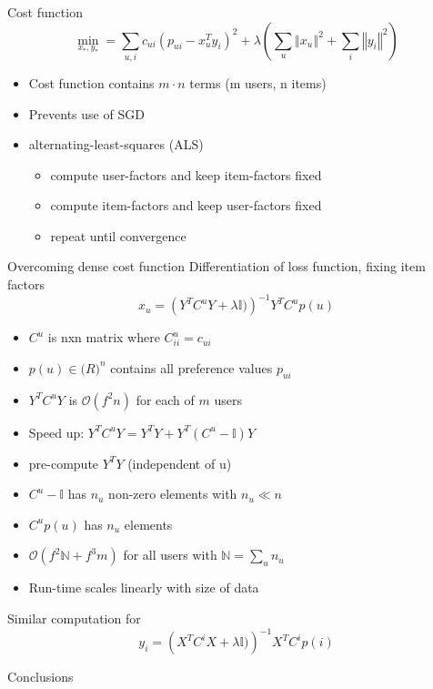\documentclass[aspectratio=1610]{beamer}
\begin{document}
\begin{frame}{Cost function}
    \begin{equation}
        \min_{x_{*}, y_{*}} = \sum_{u,i} c_{ui}\left( p_{ui} - x_{u}^{T} y_{i} \right)^2 + \lambda \left( \sum_{u} \left\Vert x_u \right\Vert^2 + \sum_{i} \left\Vert y_i \right\Vert^2 \right)
    \end{equation}
    \begin{itemize}
        \item Cost function contains $m \cdot n$ terms (m users, n items)
        \item Prevents use of SGD
        \item alternating-least-squares (ALS)
        \begin{itemize}
            \item compute user-factors and keep item-factors fixed
            \item compute item-factors and keep user-factors fixed
            \item repeat until convergence
        \end{itemize}
    \end{itemize}
\end{frame}

\begin{frame}{Overcoming dense cost function}
Differentiation of loss function, fixing item factors
\begin{equation}
    x_u = \left(Y^T C^u Y + \lambda \mathbb{I})\right)^{-1} Y^T C^u p(u)
\end{equation}
\begin{itemize}
    \item $C^u$ is nxn matrix where $C_{ii}^u = c_{ui}$
    \item $p(u) \in \mathbb(R)^n$ contains all preference values $p_{ui}$
    \item $Y^T C^u Y$ is $\mathcal{O}(f^2n)$ for each of $m$ users
    \item Speed up: $Y^T C^u Y = Y^TY + Y^T\left(C^u - \mathbb{I}
    \right)Y$
    \item pre-compute $Y^TY$ (independent of u)
    \item $C^u - \mathbb{I}$ has $n_u$ non-zero elements with $n_u \ll n$
    \item $C^u p(u)$ has $n_u$ elements
    \item $\mathcal{O}(f^2\mathbb{N} + f^3m)$ for all users with $\mathbb{N} = \sum_{u}n_u$
    \item Run-time scales linearly with size of data
\end{itemize}
Similar computation for
\begin{equation}
    y_i = \left(X^TC^iX + \lambda \mathbb{I})\right)^{-1} X^T C^i p(i)
\end{equation}
\end{frame}

\begin{frame}{Conclusions}
\end{frame}
\end{document}
